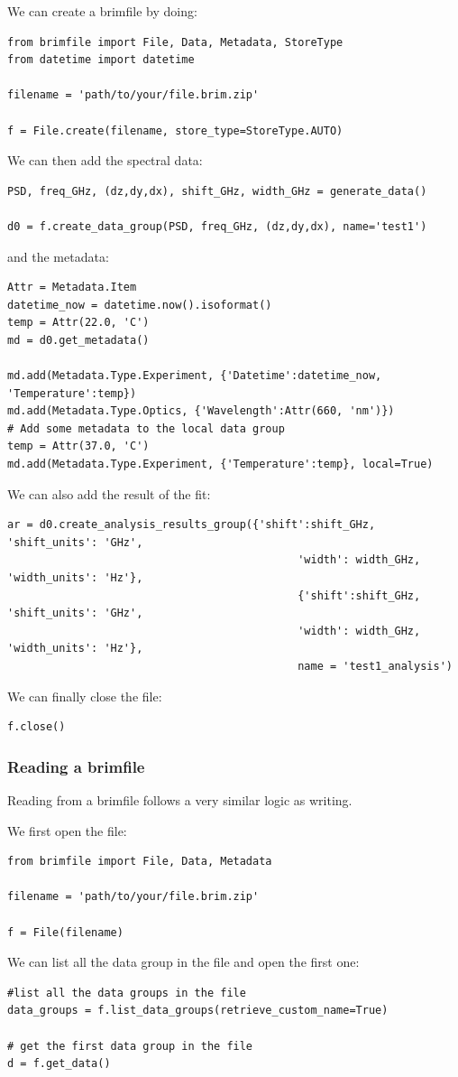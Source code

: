 \documentclass{article}
\begin{document}
We can create a brimfile by doing: 
\begin{lstlisting}
from brimfile import File, Data, Metadata, StoreType
from datetime import datetime

filename = 'path/to/your/file.brim.zip' 

f = File.create(filename, store_type=StoreType.AUTO)
\end{lstlisting}
We can then add the spectral data:
\begin{lstlisting}
PSD, freq_GHz, (dz,dy,dx), shift_GHz, width_GHz = generate_data()

d0 = f.create_data_group(PSD, freq_GHz, (dz,dy,dx), name='test1')
\end{lstlisting}
and the metadata:
\begin{lstlisting}
Attr = Metadata.Item
datetime_now = datetime.now().isoformat()
temp = Attr(22.0, 'C')
md = d0.get_metadata()

md.add(Metadata.Type.Experiment, {'Datetime':datetime_now, 'Temperature':temp})
md.add(Metadata.Type.Optics, {'Wavelength':Attr(660, 'nm')})
# Add some metadata to the local data group   
temp = Attr(37.0, 'C')
md.add(Metadata.Type.Experiment, {'Temperature':temp}, local=True)
\end{lstlisting}
We can also add the result of the fit:
\begin{lstlisting}
ar = d0.create_analysis_results_group({'shift':shift_GHz, 'shift_units': 'GHz',
                                             'width': width_GHz, 'width_units': 'Hz'},
                                             {'shift':shift_GHz, 'shift_units': 'GHz',
                                             'width': width_GHz, 'width_units': 'Hz'},
                                             name = 'test1_analysis')
\end{lstlisting}
We can finally close the file:
\begin{lstlisting}
f.close()
\end{lstlisting}

\subsubsection{Reading a brimfile}
Reading from a brimfile follows a very similar logic as writing.

We first open the file:
\begin{lstlisting}
from brimfile import File, Data, Metadata

filename = 'path/to/your/file.brim.zip' 

f = File(filename)
\end{lstlisting}
We can list all the data group in the file and open the first one:
\begin{lstlisting}
#list all the data groups in the file
data_groups = f.list_data_groups(retrieve_custom_name=True)

# get the first data group in the file
d = f.get_data()
\end{lstlisting}
\end{document}
